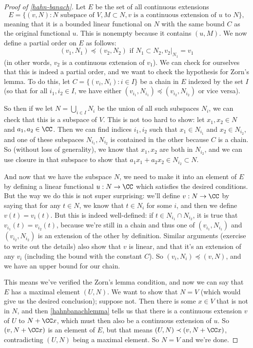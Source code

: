\begin{proof}[Proof of \cref{hahn-banach}]
Let $E$ be the set of all continuous extensions 
\[
    E = \{(v, N): N \text{ subspace of }V, M \subset N, v \text{ is a continuous extension of }u \text{ to }N\},
\]
meaning that it is a bounded linear functional on $N$ with the same bound $C$ as the original functional $u$. This is nonempty because it contains $(u, M)$. We now define a partial order on $E$ as follows:
\[
    (v_1, N_1) \preceq (v_2, N_2) \text{ if }N_1 \subset N_2, v_2|_{N_1} = v_1
\]
(in other words, $v_2$ is a continuous extension of $v_1$). We can check for ourselves that this is indeed a partial order, and we want to check the hypothesis for Zorn's lemma. To do this, let $C = \{(v_i, N_i): i \in I\}$ be a chain in $E$ indexed by the set $I$ (so that for all $i_1, i_2 \in I$, we have either $(v_{i_1}, N_{i_1}) \preceq (v_{i_2}, N_{i_2})$ or vice versa). 

So then if we let $N = \bigcup_{i \in I} N_i$ be the union of all such subspaces $N_i$, we can check that this is a subspace of $V$. This is not too hard to show: let $x_1, x_2 \in N$ and $a_1, a_2 \in \CC$. Then we can find indices $i_1, i_2$ such that $x_1 \in N_{i_1}$ and $x_2 \in N_{i_2}$, and one of these subspaces $N_{i_1}, N_{i_2}$ is contained in the other because $C$ is a chain. So (without loss of generality), we know that $x_1, x_2$ are both in $N_{i_2}$, and we can use closure in that subspace to show that $a_1x_1 + a_2x_2 \in N_{i_2} \subset N$.

And now that we have the subspace $N$, we need to make it into an element of $E$ by defining a linear functional $u: N \to \CC$ which satisfies the desired conditions. But the way we do this is not super surprising: we'll define $v: N \to \CC$ by saying that for any $t \in N$, we know that $t \in N_i$ for some $i$, and then we define $v(t) = v_i(t)$. But this is indeed well-defined: if $t \in N_{i_1} \cap N_{i_2}$, it is true that $v_{i_1}(t) = v_{i_2}(t)$, because we're still in a chain and thus one of $(v_{i_1}, N_{i_1})$ and $(v_{i_2}, N_{i_2})$ is an extension of the other by definition. Similar arguments (exercise to write out the details) also show that $v$ is linear, and that it's an extension of any $v_i$ (including the bound with the constant $C$). So $(v_i, N_i) \preceq (v, N)$, and we have an upper bound for our chain.

This means we've verified the Zorn's lemma condition, and now we can say that $E$ has a maximal element $(U, N)$. We want to show that $N = V$ (which would give us the desired conclusion); suppose not. Then there is some $x \in V$ that is not in $N$, and then \cref{hahnbanachlemma} tells us that there is a continuous extension $v$ of $U$ to $N + \CC x$, which must then also be a continuous extension of $u$. So $(v, N + \CC x)$ is an element of $E$, but that means $(U, N) \prec (v, N + \CC x)$, contradicting $(U, N)$ being a maximal element. So $N = V$ and we're done. 
\end{proof}

